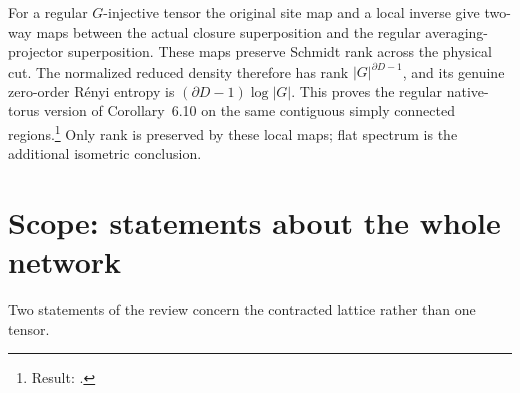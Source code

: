 \documentclass{article}
\begin{document}
For a regular $G$-injective tensor the original site map and a local
inverse give two-way maps between the actual closure superposition and
the regular averaging-projector superposition. These maps preserve
Schmidt rank across the physical cut. The normalized reduced density
therefore has rank $|G|^{\partial D-1}$, and its genuine zero-order
R\'enyi entropy is $(\partial D-1)\log|G|$. This proves the regular
native-torus version of Corollary~6.10 on the same contiguous simply
connected regions.\footnote{Result:
    .} Only rank is preserved by these local maps;
flat spectrum is the additional isometric conclusion.

\section{Scope: statements about the whole network}
Two statements of the review concern the contracted lattice rather than
one tensor.
\end{document}
